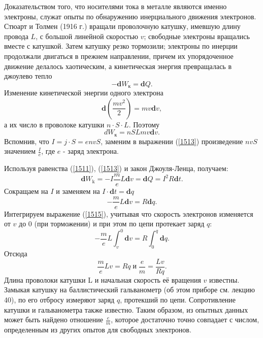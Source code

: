 \documentclass[a4paper,10pt]{book}
\begin{document}
Доказательством того, что носителями тока в металле являются именно электроны, служат опыты по обнаружению инерциального движения электронов.
Стюарт и Толмен (1916 г.) вращали проволочную катушку, имевшую длину провода $L$, с большой линейной скоростью $v$; свободные электроны вращались
вместе с катушкой. Затем катушку резко тормозили; электроны по инерции продолжали двигаться в прежнем направлении, причем их упорядоченное движение
делалось хаотическим, а кинетическая энергия превращалась в джоулево тепло
\begin{equation}\label{1511}
 -\mathbf{d}W_\text{к} = \mathbf{d}Q.
\end{equation}
Изменение кинетической энергии одного электрона
\begin{equation}\label{1512}
 \mathbf{d}(\frac{mv^2}{2}) = mv\mathbf{d}v,
\end{equation}
а их число в проволоке катушки $n\cdot S\cdot L$. Поэтому 
\begin{equation}\label{1513}
 dW_\text{к} = nSLmv\mathbf{d}v.
\end{equation}
Вспомнив, что $I = j \cdot S = envS$, заменим в выражении (\ref{1513}) произведение $nvS$ значением $\frac{I}{e}$, где $e$ - заряд электрона.

Используя равенства (\ref{1511}), (\ref{1513}) и закон Джоуля-Ленца, получаем:
\begin{equation}\label{1514}
 \mathbf{d}W_\text{k} = -I\frac{m}{e}L\mathbf{d}v = \mathbf{d}Q = I^2R\mathbf{d}t.
\end{equation}
Сокращаем на $I$ и заменяем на $I\cdot \mathbf{d}t = \mathbf{d}q$
\begin{equation}\label{1515}
 -\frac{m}{e}L\mathbf{d}v = R\mathbf{d}q.
\end{equation}
Интегрируем выражение (\ref{1515}), учитывая что скорость электронов изменяется от $v$ до $0$ (при торможении) и при этом по цепи протекает заряд
$q$:
\begin{equation*}
 -\frac{m}{e}L\int_v^0\mathbf{d}v = R\int_0^q\mathbf{d}q.
\end{equation*}
Отсюда
\begin{equation}\label{1516}
 \frac{m}{e}Lv = Rq \;\text{и}\;\frac{e}{m}=\frac{Lv}{Rq}.
\end{equation}
Длина проволоки катушки L и начальная скорость её вращения $v$ известны. Замыкая катушку на баллистический гальванометр (об этом приборе см. лекцию 40),
по его отбросу измеряют заряд $q$, протекший по цепи. Сопротивление катушки и гальванометра также известно. Таким образом, из опытных данных
может быть найдено отношение $\frac{e}{m}$, которое достаточно точно совпадает с числом, определенным из других опытов для свободных электронов.
\end{document}
